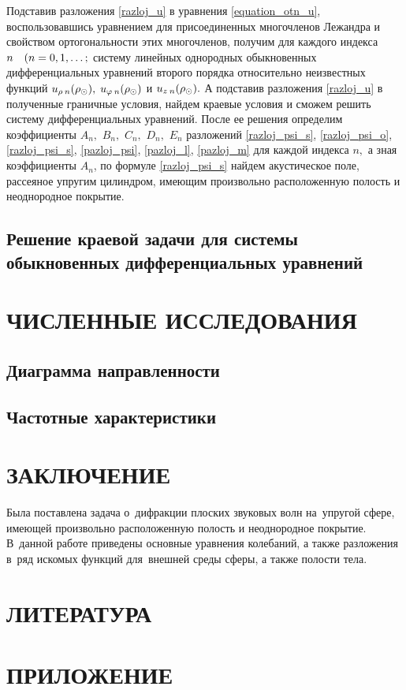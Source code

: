 Подставив разложения \eqref{razloj_u} в уравнения \eqref{equation_otn_u}, воспользовавшись уравнением для присоединенных многочленов Лежандра и свойством ортогональности этих многочленов, получим для каждого индекса $n \quad(n = 0,1,\ldots;$ систему линейных однородных обыкновенных дифференциальных уравнений второго порядка относительно неизвестных функций $u_{\rho\:n}(\rho_\odot),$ $u_{\varphi\:n}(\rho_\odot)$ и $u_{z\:n}(\rho_\odot).$ А подставив разложения \eqref{razloj_u} в полученные граничные условия, найдем краевые условия и сможем решить  систему дифференциальных уравнений. После ее решения определим коэффициенты $A_n,$ $B_n,$ $C_n,$ $D_n,$ $E_n$ разложений  \eqref{razloj_psi_s}, \eqref{razloj_psi_o}, \eqref{razloj_psi_s}, \eqref{pazloj_psi}, \eqref{pazloj_l}, \eqref{pazloj_m} для каждой индекса $n,$ а зная коэффициенты ${A}_{n}$, по формуле \eqref{razloj_psi_s} найдем акустическое поле, рассеяное упругим цилиндром, имеющим произвольно расположенную полость и неоднородное покрытие.
\newpage
\subsection{Решение краевой задачи для системы обыкновенных дифференциальных уравнений}

\newpage
\section{ЧИСЛЕННЫЕ ИССЛЕДОВАНИЯ}

\newpage
\subsection{Диаграмма направленности}

\newpage
\subsection{Частотные характеристики}


\newpage
\section*{ЗАКЛЮЧЕНИЕ}
Была поставлена задача о~дифракции плоских звуковых волн на~упругой сфере, имеющей произвольно расположенную полость и неоднородное покрытие. В~данной работе приведены основные уравнения колебаний, а также разложения в~ряд искомых функций для~внешней среды сферы, а также полости тела.

\newpage
\section*{ЛИТЕРАТУРА}

\newpage
\section*{ПРИЛОЖЕНИЕ}
